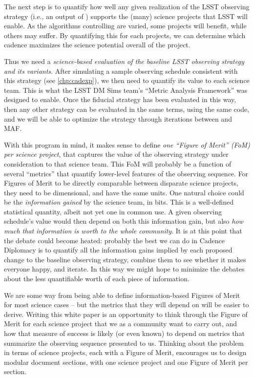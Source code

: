 The next step is to quantify how well any given realization of the
LSST observing strategy (i.e., an output of \OpSim) supports the (many)
science projects that LSST will enable.  As the algorithms controlling
\OpSim are varied, some projects will benefit, while others may
suffer.  By quantifying this for each projects, we can determine which cadence
maximizes the science potential overall of the project. 

Thus we need 
a {\it science-based evaluation of the baseline
  LSST observing strategy and its variants}. After simulating a sample
observing schedule consistent with this strategy (see
\autoref{chp:cadexp}), we then need to quantify its value to each
science team.  This is what the LSST DM Sims team's ``Metric Analysis
Framework'' was designed to enable. Once the fiducial strategy has
been evaluated in this way, then any other strategy can be evaluated
in the same terms, using the same code, and we will be able to %
optimize the strategy through iterations between \OpSim and MAF.

With this program in mind, it makes sense to define {\it one ``Figure
of Merit'' (FoM) per science project}, that captures the value of  the
observing strategy under consideration to that science team. This FoM
will probably be a function of several ``metrics'' that quantify
lower-level features of the observing sequence.  For Figures of Merit
to be directly comparable between disparate science projects,  they
need to be dimensional, and have the same units. One natural
choice could be the {\it information gained} by the science team, in
bits. This is a well-defined statistical quantity, albeit not yet one
in common use. A given observing schedule's value would then depend on
both this information gain, but also {\it how much that information is
worth to the whole community}. It is at this point that the debate
could become heated: probably the best we can do in Cadence Diplomacy
is to quantify all the information gains implied by each proposed
change to the baseline  observing strategy, combine them to see
whether it makes everyone happy, and iterate. In this way we might
hope to minimize the debates about the less quantifiable worth of each
piece of information.

We are some way from being able to define information-based Figures of
Merit for most science cases -- but the metrics that they will depend
on will be easier to derive. Writing this white paper is an
opportunity to think through the Figure of Merit for each science
project that we as a community want to carry out, and how that measure
of success is likely (or even known) to depend on metrics that
summarize the observing sequence presented to us. Thinking about the
problem in terms of science projects, each with a  Figure of Merit,
encourages us to design modular document sections, with one science
project and one Figure of Merit per section.

